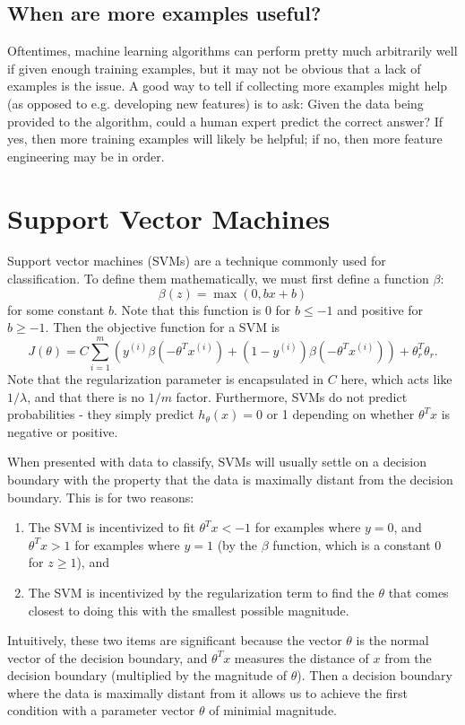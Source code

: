 \documentclass{article}
\begin{document}
\subsection{When are more examples useful?}
Oftentimes, machine learning algorithms can perform pretty much arbitrarily well if given enough training examples, but it may not be obvious that a lack of examples is the issue. A good way to tell if collecting more examples might help (as opposed to e.g. developing new features) is to ask: Given the data being provided to the algorithm, could a human expert predict the correct answer? If yes, then more training examples will likely be helpful; if no, then more feature engineering may be in order.

\section{Support Vector Machines}
Support vector machines (SVMs) are a technique commonly used for classification. To define them mathematically, we must first define a function $\beta$:
$$\beta(z) = \max(0, bx + b)$$
for some constant $b$. Note that this function is 0 for $b \le -1$ and positive for $b \ge -1$. Then the objective function for a SVM is
$$J(\theta) = C\sum_{i=1}^m \left(y^{(i)}\beta(-\theta^Tx^{(i)}) + (1 - y^{(i)})\beta(-\theta^Tx^{(i)})\right) + \theta_r^T\theta_r.$$
Note that the regularization parameter is encapsulated in $C$ here, which acts like $1/\lambda$, and that there is no $1/m$ factor. Furthermore, SVMs do not predict probabilities - they simply predict $h_\theta(x) = 0$ or 1 depending on whether $\theta^Tx$ is negative or positive.

When presented with data to classify, SVMs will usually settle on a decision boundary with the property that the data is maximally distant from the decision boundary. This is for two reasons:
\begin{enumerate}
\item The SVM is incentivized to fit $\theta^Tx < -1$ for examples where $y = 0$, and $\theta^Tx > 1$ for examples where $y = 1$ (by the $\beta$ function, which is a constant 0 for $z \ge 1$), and
\item The SVM is incentivized by the regularization term to find the $\theta$ that comes closest to doing this with the smallest possible magnitude.
\end{enumerate}
Intuitively, these two items are significant because the vector $\theta$ is the normal vector of the decision boundary, and $\theta^Tx$ measures the distance of $x$ from the decision boundary (multiplied by the magnitude of $\theta$). Then a decision boundary where the data is maximally distant from it allows us to achieve the first condition with a parameter vector $\theta$ of minimial magnitude.
\end{document}
